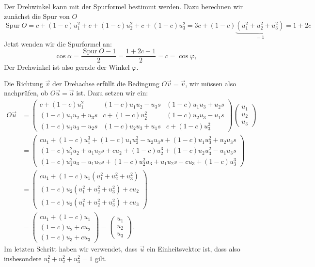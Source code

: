 \begin{loesung}
\begin{teilaufgaben}
\item
Der Drehwinkel kann mit der Spurformel bestimmt werden. Dazu berechnen
wir zunächst die Spur von $O$
\[
\operatorname{Spur}O=
c+(1-c)u_1^2+c+(1-c)u_2^2+c+(1-c)u_3^2=3c+(1-c)\underbrace{(u_1^2+u_2^2+u_3^2)}_{=1}=1+2c
\]
Jetzt wenden wir die Spurformel an:
\[
\cos\alpha=\frac{\operatorname{Spur}O-1}2=\frac{1+2c-1}2=c=\cos\varphi,
\]
Der Drehwinkel ist also gerade der Winkel $\varphi.$
\item
Die Richtung $\vec v$ der Drehachse erfüllt die Bedingung $O\vec v=\vec v$,
wir müssen also nachprüfen, ob $O\vec u=\vec u$ ist.
Dazu setzen wir ein:
\begin{align*}
O\vec u
&=
\begin{pmatrix}
c+(1-c)u_1^2    &(1-c)u_1u_2-u_3s   &(1-c)u_1u_3+u_2s\\
(1-c)u_1u_2+u_3s&c+(1-c)u_2^2       &(1-c)u_2u_3-u_1s\\
(1-c)u_1u_3-u_2s&(1-c)u_2u_3+u_1s   &c+(1-c)u_3^2
\end{pmatrix}
\begin{pmatrix}u_1\\u_2\\u_3\end{pmatrix}
\\
&=
\begin{pmatrix}
cu_1+(1-c)u_1^3 +(1-c)u_1u_2^2-u_2u_3s+(1-c)u_1u_3^2+u_2u_3s\\
(1-c)u_1^2u_2+u_1u_3s+cu_2+(1-c)u_2^3+(1-c)u_2u_3^2-u_1u_3s\\
(1-c)u_1^2u_3-u_1u_2s+(1-c)u_2^2u_3+u_1u_2s+cu_3+(1-c)u_3^3
\end{pmatrix}
\\
&=
\begin{pmatrix}
cu_1+(1-c)u_1(u_1^2+u_2^2+u_3^2)\\
(1-c)u_2(u_1^2+u_2^2+u_3^2)+cu_2\\
(1-c)u_3(u_1^2+u_2^2+u_3^2)+cu_3
\end{pmatrix}
\\
&=
\begin{pmatrix}
cu_1+(1-c)u_1\\
(1-c)u_2+cu_2\\
(1-c)u_3+cu_3
\end{pmatrix}
=\begin{pmatrix}u_1\\u_2\\u_3\end{pmatrix}.
\end{align*}
Im letzten Schritt haben wir verwendet, dass $\vec u$ ein Einheitsvektor
ist, dass also insbesondere $u_1^2 + u_2^2 + u_3^2=1$ gilt.
\qedhere
\end{teilaufgaben}
\end{loesung}


